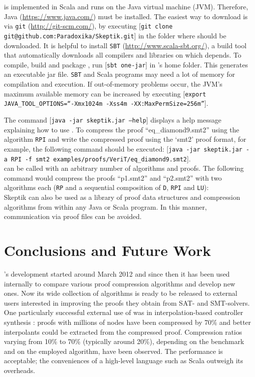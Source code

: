 \documentclass{llncs}
\newcommand{\com}[1]{[\texttt{#1}]}
\begin{document}
{\skeptik} is implemented in Scala and runs on the Java virtual machine (JVM). Therefore, Java (\url{https://www.java.com/}) must be installed. The easiest way to download {\skeptik} is via \texttt{git} (\url{http://git-scm.com/}), by executing \com{git clone git@github.com:Paradoxika/Skeptik.git} in the folder where {\skeptik} should be downloaded. It is helpful to install \texttt{SBT} (\url{http://www.scala-sbt.org/}), a build tool that automatically downloads all compilers and libraries on which {\skeptik} depends. To compile, build and package {\skeptik}, run \com{sbt one-jar} in {\skeptik}'s home folder. This generates an executable jar file.
%
\texttt{SBT} and Scala programs may need a lot of memory for compilation and execution. If out-of-memory problems occur, the JVM's maximum available memory can be increased by executing \com{export JAVA\_TOOL\_OPTIONS=``-Xmx1024m -Xss4m -XX:MaxPermSize=256m''}.

The command \com{java -jar skeptik.jar --help} displays a help message explaining how to use {\skeptik}. To compress the proof ``eq\_diamond9.smt2'' using the algorithm \texttt{RPI} and write the compressed proof using the `smt2' proof format, for example, the following command should be executed: \com{java -jar skeptik.jar -a RPI -f smt2 examples/proofs/VeriT/eq\_diamond9.smt2}. \\
{\skeptik} can be called with an arbitrary number of algorithms and proofs. The following command would compress the proofs ``p1.smt2'' and ``p2.smt2'' with two algorithms each (\texttt{RP} and a sequential composition of \texttt{D}, \texttt{RPI} and \texttt{LU}): \\
\com{java -jar skeptik.jar -a RP -a (D-RPI-LU) p1.smt2 p2.smt2} 

Skeptik can also be used as a library of proof data structures and compression algorithms from within any Java or Scala program. In this manner, communication via proof files can be avoided.


\section{Conclusions and Future Work}

{\skeptik}'s development started around March 2012 and since then it has been used internally to compare various proof compression algorithms and develop new ones. Now its wide collection of algorithms is ready to be released to external users interested in improving the proofs they obtain from SAT- and SMT-solvers. One particularly successful external use of {\skeptik} was in interpolation-based controller synthesis \cite{Hofferek}: proofs with millions of nodes have been compressed by 70\% and better interpolants could be extracted from the compressed proof. Compression ratios varying from 10\% to 70\% (typically around 20\%), depending on the benchmark and on the employed algorithm, have been observed. The performance is acceptable; the conveniences of a high-level language such as Scala outweigh its overheads.
%
\end{document}
